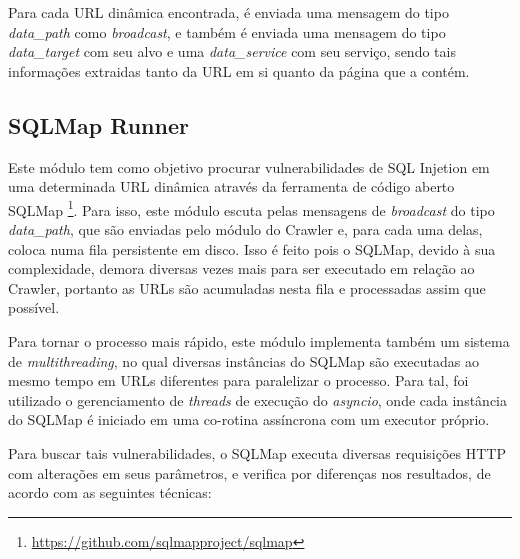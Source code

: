     Para cada URL dinâmica encontrada, é enviada uma mensagem do tipo \textit{data\_path} como \textit{broadcast}, e também é enviada uma mensagem do tipo \textit{data\_target} com seu alvo e uma \textit{data\_service} com seu serviço, sendo tais informações extraidas tanto da URL em si quanto da página que a contém.
    
    \subsection{SQLMap Runner}
    Este módulo tem como objetivo procurar vulnerabilidades de SQL Injetion em uma determinada URL dinâmica através da ferramenta de código aberto SQLMap \footnote{\url{https://github.com/sqlmapproject/sqlmap}}. Para isso, este módulo escuta pelas mensagens de \textit{broadcast} do tipo \textit{data\_path}, que são enviadas pelo módulo do Crawler e, para cada uma delas, coloca numa fila persistente em disco. Isso é feito pois o SQLMap, devido à sua complexidade, demora diversas vezes mais para ser executado em relação ao Crawler, portanto as URLs são acumuladas nesta fila e processadas assim que possível.
    
    Para tornar o processo mais rápido, este módulo implementa também um sistema de \textit{multithreading}, no qual diversas instâncias do SQLMap são executadas ao mesmo tempo em URLs diferentes para paralelizar o processo. Para tal, foi utilizado o gerenciamento de \textit{threads} de execução do \textit{asyncio}, onde cada instância do SQLMap é iniciado em uma co-rotina assíncrona com um executor próprio.
    
    Para buscar tais vulnerabilidades, o SQLMap executa diversas requisições HTTP com alterações em seus parâmetros, e verifica por diferenças nos resultados, de acordo com as seguintes técnicas:
    
